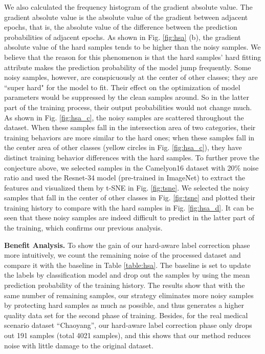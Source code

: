 We also calculated the frequency histogram of the gradient absolute value. The gradient absolute value is the absolute value of the gradient between adjacent epochs, that is, the absolute value of the difference between the prediction probabilities of adjacent epochs. As shown in Fig. \ref{fig:hsa} (b), the gradient absolute value of the hard samples tends to be higher than the noisy samples. We believe that the reason for this phenomenon is that the hard samples' hard fitting attribute makes the prediction probability of the model jump frequently. Some noisy samples, however, are conspicuously at the center of other classes; they are ``super hard" for the model to fit. Their effect on the optimization of model parameters would be suppressed by the clean samples around. So in the latter part of the training process, their output probabilities would not change much. As shown in Fig. \ref{fig:hsa_c}, the noisy samples are scattered throughout the dataset. When these samples fall in the intersection area of two categories, their training behaviors are more similar to the hard ones; when these samples fall in the center area of other classes (yellow circles in Fig. \ref{fig:hsa_c}), they have distinct training behavior differences with the hard samples. To further prove the conjecture above, we selected samples in the Camelyon16 dataset with 20\% noise ratio and used the Resnet-34 model (pre-trained in ImageNet) to extract the features and visualized them by t-SNE\cite{laurens2008visiualizing} in Fig. \ref{fig:tsne}. We selected the noisy samples that fall in the center of other classes in Fig. \ref{fig:tsne} and plotted their training history to compare with the hard samples in Fig. \ref{fig:hsa_d}. It can be seen that these noisy samples are indeed difficult to predict in the latter part of the training, which confirms our previous analysis.






\textbf{Benefit Analysis.} To show the gain of our hard-aware label correction phase more intuitively, we count the remaining noise of the processed dataset and compare it with the baseline in Table \ref{table:hsa}. The baseline is set to update the labels by classification model and drop out the samples by using the mean prediction probability of the training history. The results show that with the same number of remaining samples, our strategy eliminates more noisy samples by protecting hard samples as much as possible, and thus generates a higher quality data set for the second phase of training. {Besides, for the real medical scenario dataset ``Chaoyang'', our hard-aware label correction phase only drops out 191 samples (total 4021 samples), and this shows that our method reduces noise with little damage to the original dataset.}



